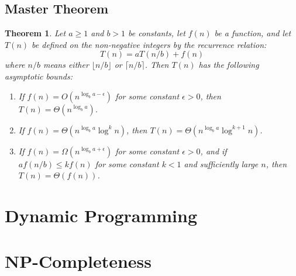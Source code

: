 \documentclass[11pt,fleqn]{article}
\newtheorem*{theorem}{Theorem}
\begin{document}
\subsection{Master Theorem}
\begin{theorem}
    Let $a \geq 1$ and $b > 1$ be constants, let $f(n)$ be a function, and let $T(n)$ be defined on the non-negative integers by the recurrence relation: \[
        T(n) = aT(n/b) + f(n)
    \]
    where $n/b$ means either $\lfloor n/b \rfloor$ or $\lceil n/b \rceil$. Then $T(n)$ has the following asymptotic bounds: \begin{enumerate}
        \item If $f(n) = O(n^{\log_b a - \epsilon})$ for some constant $\epsilon > 0$, then $T(n) = \Theta(n^{\log_b a})$.
        \item If $f(n) = \Theta(n^{\log_b a} \log^k n)$, then $T(n) = \Theta(n^{\log_b a} \log^{k+1} n)$.
        \item If $f(n) = \Omega(n^{\log_b a + \epsilon})$ for some constant $\epsilon > 0$, and if $a f(n/b) \leq k f(n)$ for some constant $k < 1$ and sufficiently large $n$, then $T(n) = \Theta(f(n))$.
    \end{enumerate}
\end{theorem}

\section{Dynamic Programming}


\section{NP-Completeness}
\end{document}
